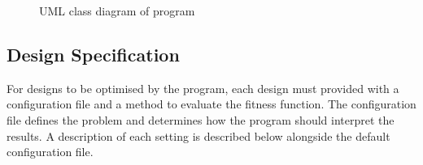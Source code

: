 \documentclass[10pt,a4paper]{article}
\begin{document}
\begin{figure}[H]
	\caption{UML class diagram of program}
\end{figure}

\subsection{Design Specification}

For designs to be optimised by the program, each design must provided with a configuration file and a method to evaluate the fitness function. The configuration file defines the problem and determines how the program should interpret the results. A description of each setting is described below alongside the default configuration file.
\end{document}
